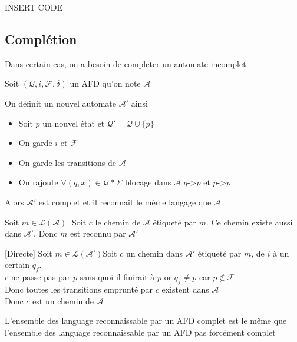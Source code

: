 INSERT CODE

\subsection{Complétion}

Dans certain cas, on a besoin de completer un automate incomplet.

\begin{thr}
    Soit $(\mathcal{Q},i,\mathcal{F},\delta)$ un AFD qu'on note $\mathcal{A}$

On définit un nouvel automate $\mathcal{A}'$ ainsi
\begin{itemize}
    \item Soit $p$ un nouvel état et $\mathcal{Q}'=\mathcal{Q}\cup\{p\}$
    \item On garde $i$ et $\mathcal{F}$
    \item On garde les transitions de $\mathcal{A}$
    \item On rajoute $\forall (q,x)\in \mathcal{Q}*\Sigma$ blocage dans $\mathcal{A}$ $q$->$p$ et $p$->$p$
\end{itemize}

Alors $\mathcal{A}'$ est complet et il reconnait le même langage que $\mathcal{A}$

\end{thr}

\begin{dem}
    [Indirecte] Soit $m\in\mathcal{L}(\mathcal{A})$. Soit $c$ le chemin de $\mathcal{A}$ étiqueté par
    $m$. Ce chemin existe aussi dans $\mathcal{A}'$. Donc $m$ est reconnu par $\mathcal{A}'$

    [Directe] Soit $m\in\mathcal{L}(\mathcal{A}')$Soit $c$ un chemin dans $\mathcal{A}'$ étiqueté par $m$, de
    $i$ à un certain $q_f$.\\
    
    $c$ ne passe pas par $p$ sans quoi il finirait à $p$ or $q_f\not= p$ car $p\not\in \mathcal{F}$\\
    Donc toutes les transitions emprunté par $c$ existent dans $\mathcal{A}$\\
    Donc $c$ est un chemin de $\mathcal{A}$
\end{dem}

\begin{cor}
    L'ensemble des language reconnaissable par un AFD complet est le même que l'ensemble des language reconnaissable par un AFD pas forcément complet
\end{cor}

